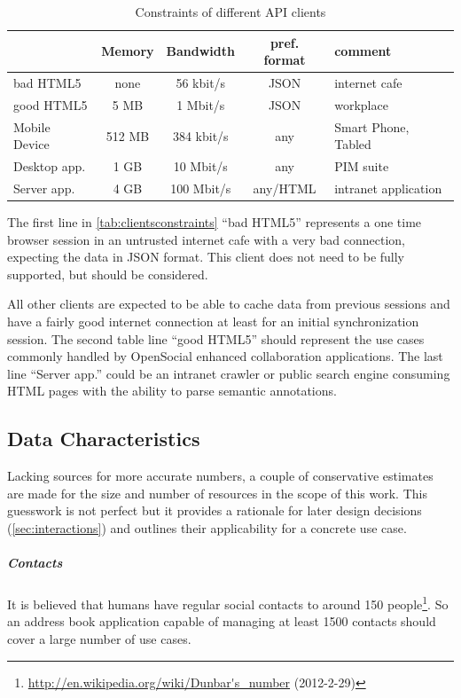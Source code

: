 \documentclass[11pt,a4paper,headsepline,twoside]{scrartcl}		%
\newcommand{\citeurl}[2]{\url{#1} (#2)}
\begin{document}
\begin{table}[tbh]
  \centering
  \begin{tabular}[tbh]{ l || c | c | c | l }
                & Memory & Bandwidth & pref. format & comment \\  \hline
  bad HTML5 & none & 56 kbit/s & JSON & internet cafe\\
  good HTML5 & 5 MB & 1 Mbit/s & JSON & workplace\\
  Mobile Device &  512 MB & 384 kbit/s & any & Smart Phone, Tabled \\ 
  Desktop app. &  1 GB & 10 Mbit/s  & any & PIM suite \\
  Server app.  &  4 GB & 100 Mbit/s & any/HTML & intranet application \\
  \end{tabular}
  \caption{Constraints of different API clients}
  \label{tab:clientsconstraints}
\end{table}

The first line in \autoref{tab:clientsconstraints} ``bad HTML5'' represents a
one time browser session in an untrusted internet cafe with a very bad
connection, expecting the data in JSON format. This client does not need to be
fully supported, but should be considered.

All other clients are expected to be able to cache data from previous sessions
and have a fairly good internet connection at least for an initial
synchronization session. The second table line ``good HTML5'' should represent
the use cases commonly handled by OpenSocial enhanced collaboration
applications. The last line ``Server app.'' could be an intranet crawler or
public search engine consuming HTML pages with the ability to parse semantic
annotations.

\subsection{Data Characteristics}
\label{sec:data-characteristics}

Lacking sources for more accurate numbers, a couple of conservative estimates
are made for the size and number of resources in the scope of this work. This
guesswork is not perfect but it provides a rationale for later design
decisions (\autoref{sec:interactions}) and outlines their applicability for a
concrete use case.

\subparagraph{Contacts}

It is believed that humans have regular social contacts to around 150
people\footnote{\citeurl{http://en.wikipedia.org/wiki/Dunbar's_number}{2012-2-29}}. So
an address book application capable of managing at least 1500 contacts should
cover a large number of use cases.
\end{document}
